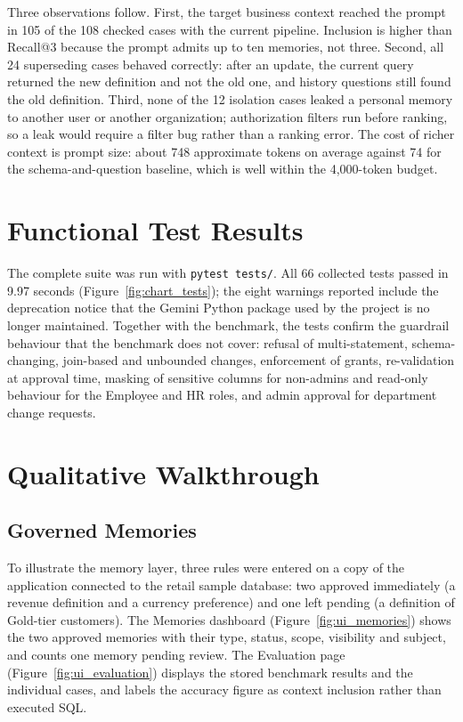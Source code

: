 Three observations follow. First, the target business context reached the prompt in 105 of
the 108 checked cases with the current pipeline. Inclusion is higher than Recall@3 because
the prompt admits up to ten memories, not three. Second, all 24 superseding cases behaved
correctly: after an update, the current query returned the new definition and not the old
one, and history questions still found the old definition. Third, none of the 12 isolation
cases leaked a personal memory to another user or another organization; authorization
filters run before ranking, so a leak would require a filter bug rather than a ranking
error. The cost of richer context is prompt size: about 748 approximate tokens on average
against 74 for the schema-and-question baseline, which is well within the 4,000-token budget.

\section{Functional Test Results}
The complete suite was run with \texttt{pytest tests/}. All 66 collected tests passed in
9.97 seconds (Figure~\ref{fig:chart_tests}); the eight warnings reported include the
deprecation notice that the Gemini Python package used by the project is no
longer maintained. Together with the benchmark, the tests confirm the guardrail behaviour that the
benchmark does not cover: refusal of multi-statement, schema-changing, join-based and
unbounded changes, enforcement of grants, re-validation at approval time, masking of
sensitive columns for non-admins and read-only behaviour for the Employee and HR roles, and admin approval for department
change requests.

\begin{figure}[H]
    \centering
\end{figure}

\section{Qualitative Walkthrough}

\subsection{Governed Memories}
To illustrate the memory layer, three rules were entered on a copy of the application
connected to the retail sample database: two approved immediately (a revenue definition and
a currency preference) and one left pending (a definition of Gold-tier customers). The
Memories dashboard (Figure~\ref{fig:ui_memories}) shows the two approved memories with
their type, status, scope, visibility and subject, and counts one memory pending review. The
Evaluation page (Figure~\ref{fig:ui_evaluation}) displays the stored benchmark results and
the individual cases, and labels the accuracy figure as context inclusion rather than
executed SQL.

